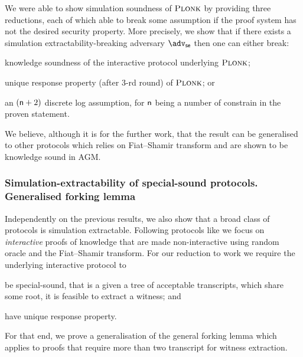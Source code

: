 \documentclass[runningheads,11pt]{llncs}
\begin{document}
	We were able to show simulation soundness of $\textsc{Plonk}$ by providing three reductions, each of which able to break some assumption if the proof system has not the desired security property. 
	More precisely, we show that if there exists a simulation extractability-breaking adversary $\advse$ then one can either break: 
	\begin{compactenum}
		\item \label{it:ks} knowledge soundness of the interactive protocol underlying $\textsc{Plonk}$; 
		\item \label{it:dlog} unique response property (after $3$-rd round) of $\textsc{Plonk}$; or 
		\item \label{it:ur} an $(\mathsf{n} + 2)$ discrete log assumption, for $\mathsf{n}$ being a number of constrain in the proven statement.
	\end{compactenum}
	
	We believe, although it is for the further work, that the result can be generalised to other protocols which relies on Fiat--Shamir transform and are shown to be knowledge sound in AGM.
	
	\subsubsection*{Simulation-extractability of special-sound protocols. Generalised forking lemma}
	Independently on the previous results, we also show that a broad class of protocols is simulation extractable. 
	Following protocols like \cite{EPRINT:GabWilCio19,CCS:MBKM19,EC:CHMMVW20} we focus on \emph{interactive} proofs of knowledge that are made non-interactive using random oracle and the Fiat--Shamir transform. For our reduction to work we require the underlying interactive protocol to 
	\begin{compactenum}
		\item be special-sound, that is a given a tree of acceptable transcripts, which share some root, it is feasible to extract a witness; and
		\item have unique response property.
	\end{compactenum}
	For that end, we prove a generalisation of the general forking lemma which applies to proofs that require more than two transcript for witness extraction.
	
	
	
\end{document}
